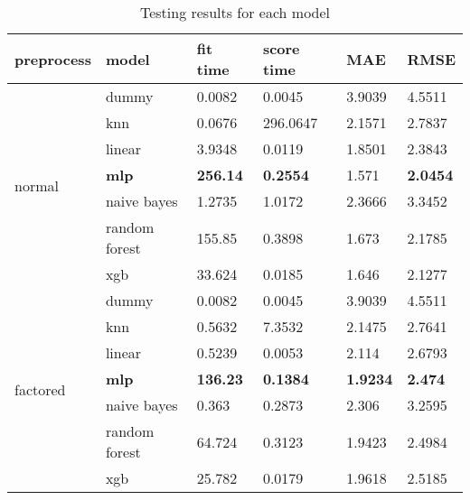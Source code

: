 \begin{table}[H]
    \centering
    \begin{tabular}{ll|llll}
    \toprule
    \textbf{preprocess} & \textbf{model} & \textbf{fit time} & \textbf{score time} & \textbf{MAE} & \textbf{RMSE} \\
    \midrule
    \multirow{7}{*}{normal}   & dummy         & 0.0082          & 0.0045          & 3.9039 & 4.5511 \\
                              & knn           & 0.0676          & 296.0647        & 2.1571 & 2.7837 \\
                              & linear        & 3.9348          & 0.0119          & 1.8501 & 2.3843 \\
                              & \textbf{mlp}  & \textbf{256.14} & \textbf{0.2554} & 1.571  & \textbf{2.0454} \\
                              & naive bayes   & 1.2735          & 1.0172          & 2.3666 & 3.3452 \\
                              & random forest & 155.85          & 0.3898          & 1.673  & 2.1785 \\
                              & xgb           & 33.624          & 0.0185          & 1.646  & 2.1277 \\
                              \midrule
    \multirow{7}{*}{factored} & dummy         & 0.0082 & 0.0045 & 3.9039 & 4.5511 \\
                              & knn           & 0.5632 & 7.3532 & 2.1475 & 2.7641 \\
                              & linear        & 0.5239 & 0.0053 & 2.114  & 2.6793 \\
                              & \textbf{mlp}  & \textbf{136.23} & \textbf{0.1384} & \textbf{1.9234} & \textbf{2.474}  \\
                              & naive bayes   & 0.363  & 0.2873 & 2.306  & 3.2595 \\
                              & random forest & 64.724 & 0.3123 & 1.9423 & 2.4984 \\
                              & xgb           & 25.782 & 0.0179 & 1.9618 & 2.5185 \\
    \bottomrule
    \end{tabular}
    \caption{Testing results for each model}
    \label{tab:test_res}
    \end{table}